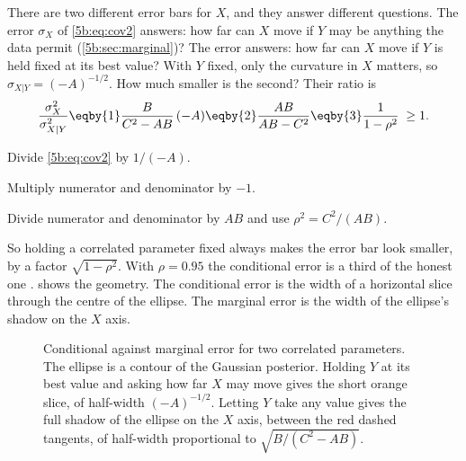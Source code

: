 There are two different error bars for $X$, and they answer different questions. The
 error $\sigma_X$ of \eqref{5b:eq:cov2} answers: how far can $X$ move
if $Y$ may be anything the data permit (\cref{5b:sec:marginal})? The
 error answers: how far can $X$ move if $Y$ is held fixed at its
best value? With $Y$ fixed, only the curvature in $X$ matters, so
$\sigma_{X|Y}=(-A)^{-1/2}$. How much smaller is the second? Their ratio is
\begin{align*}
  \frac{\sigma_X^2}{\sigma_{X|Y}^2}
  \eqby{1}\frac{B}{C^2-AB}\,(-A)
  \eqby{2}\frac{AB}{AB-C^2}
  \eqby{3}\frac{1}{1-\rho^2}\;\ge1 .
\end{align*}
\begin{explain}
  \item Divide \eqref{5b:eq:cov2} by $1/(-A)$.
  \item Multiply numerator and denominator by $-1$.
  \item Divide numerator and denominator by $AB$ and use $\rho^2=C^2/(AB)$.
\end{explain}
So holding a correlated parameter fixed always makes the error bar look smaller, by a
factor $\sqrt{1-\rho^2}$. With $\rho=0.95$ the conditional error is a third of the honest
one .  shows the geometry. The conditional
error is the width of a horizontal slice through the centre of the ellipse. The marginal
error is the width of the ellipse's shadow on the $X$ axis.

\begin{figure}[htbp]
\centering
{}
\caption{Conditional against marginal error for two correlated parameters. The ellipse
is a contour of the Gaussian posterior. Holding $Y$ at its best value and asking how
far $X$ may move gives the short orange slice, of half-width $(-A)^{-1/2}$. Letting $Y$
take any value gives the full shadow of the ellipse on the $X$ axis, between the red
dashed tangents, of half-width proportional to $\sqrt{B/(C^2-AB)}$.}
\label{5b:fig:ellipse}
\end{figure}

